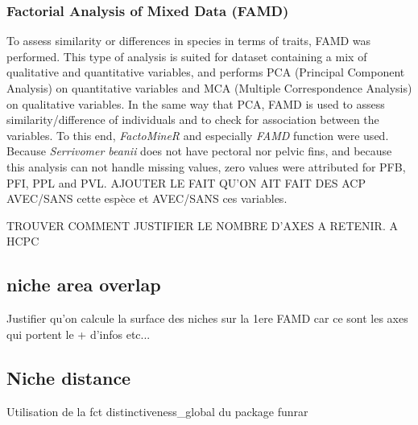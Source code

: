 \subsubsection{Factorial Analysis of Mixed Data (FAMD)}
To assess similarity or differences in species in terms of traits, FAMD was performed. This type of analysis is suited for dataset containing a mix of qualitative and quantitative variables, and performs PCA (Principal Component Analysis) on quantitative variables and MCA (Multiple Correspondence Analysis) on qualitative variables. In the same way that PCA, FAMD is used to assess similarity/difference of individuals and to check for association between the variables. To this end, \emph{FactoMineR} and especially \emph{FAMD} function were used. Because \textit{Serrivomer beanii} does not have pectoral nor pelvic fins, and because this analysis can not handle missing values, zero values were attributed for \textsc{PFB}, \textsc{PFI}, \textsc{PPL} and \textsc{PVL}. AJOUTER LE FAIT QU'ON AIT FAIT DES ACP AVEC/SANS cette espèce et AVEC/SANS ces variables.

 TROUVER COMMENT JUSTIFIER LE NOMBRE D'AXES A RETENIR. A HCPC 


 \subsection{niche area overlap}
 Justifier qu'on calcule la surface des niches sur la 1ere FAMD car ce sont les axes qui portent le + d'infos etc... 


 \subsection{Niche distance}
 Utilisation de la fct distinctiveness\_global du package funrar